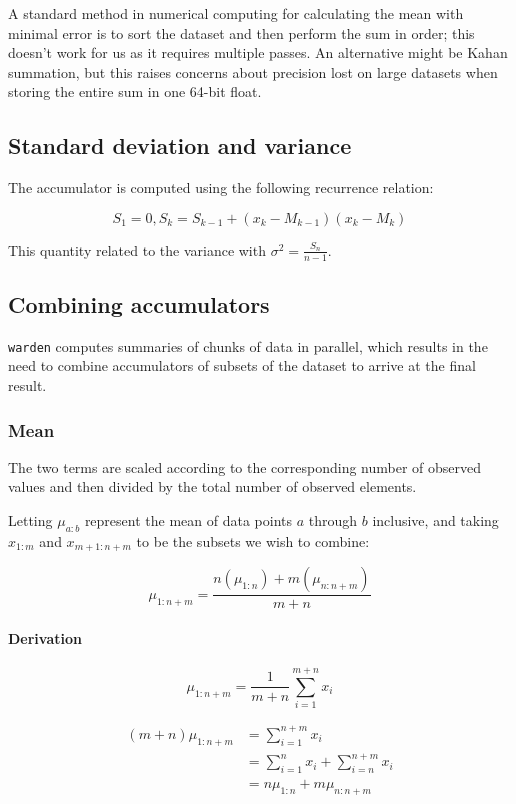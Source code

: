 \documentclass[a4paper]{article}
\begin{document}
A standard method in numerical computing for calculating the mean with
minimal error is to sort the dataset and then perform the sum in order;
this doesn't work for us as it requires multiple passes. An alternative
might be Kahan summation\cite{Kahan1965}, but this raises concerns about
precision lost on large datasets when storing the entire sum in one
64-bit float.

\subsection{Standard deviation and
variance}\label{standard-deviation-and-variance}

The accumulator is computed using the following recurrence relation\cite[pp.~232]{Knuth1997}:

\[S_1 = 0, S_k = S_{k-1} + (x_k - M_{k-1})(x_k - M_k)\]

This quantity related to the variance with
\(\sigma^2 = \frac{S_n}{n-1}\).

\subsection{Combining accumulators}\label{combining-accumulators}

\texttt{warden} computes summaries of chunks of data in parallel, which results
in the need to combine accumulators of subsets of the dataset to arrive
at the final result.

\subsubsection{Mean}\label{mean}

The two terms are scaled according to the corresponding number of
observed values and then divided by the total number of observed
elements.

Letting \(\mu_{a:b}\) represent the mean of data points \(a\) through
\(b\) inclusive, and taking \(x_{1:m}\) and \(x_{m+1:n+m}\) to be the
subsets we wish to combine:

\[\mu_{1:n+m} = \frac{n(\mu_{1:n}) + m(\mu_{n:n+m})}{m + n}\]

\paragraph{Derivation}\label{derivation}

\[\mu_{1:n+m} = \frac{1}{m+n} \sum\limits_{i=1}^{m+n} x_i\]

\[\begin{aligned}(m + n) \mu_{1:n+m} &= \sum\limits_{i=1}^{n+m} x_i \\
                                     &= \sum\limits_{i=1}^n x_i + \sum\limits_{i=n}^{n+m} x_i \\
                                     &= n\mu_{1:n} + m\mu_{n:n+m}\end{aligned}\]
\end{document}
